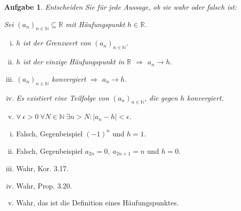 \documentclass[a4paper, 20]{exam}
\newtheorem{ex}{Aufgabe}
\newcommand\RR{\mathbb{R}}
\newcommand\NN{\mathbb{N}}
\begin{document}
\begin{ex}
Entscheiden Sie f\"ur jede Aussage, ob sie wahr oder falsch ist:

Sei $(a_n)_{n\in \NN}\subseteq \RR$ mit H\"aufungspunkt $h\in \RR$.

\begin{enumerate}[i.)]
\item
$h$ ist der Grenzwert von $(a_n)_{n\in \NN}$.

\item
$h$ ist der einzige H\"aufungspunkt in $\RR$ $\Longrightarrow$ $a_n \longrightarrow h$.

\item
$(a_n)_{n\in \NN}$ konvergiert $\Longrightarrow$ $a_n \longrightarrow h$.

\item
Es existiert eine Teilfolge von $(a_n)_{n\in \NN}$, die gegen $h$ konvergiert.

\item
$\forall \ \epsilon >0 \ \forall N\in \NN \ \exists n>N: \vert a_n - h\vert < \epsilon$.
\end{enumerate}
\end{ex}
\newpage 
\begin{solution}
\begin{enumerate}[i.)]
\item
Falsch, Gegenbeispiel $(-1)^n$ und $h=1$.
\item
Falsch, Gegenbeispiel $a_{2n}=0, \ a_{2n+1}=n$ und $h=0$.
\item
Wahr, Kor. 3.17.
\item
Wahr, Prop. 3.20.
\item
Wahr, das ist die Definition eines H\"aufungspunktes.
\end{enumerate}
\end{solution}
\end{document}
